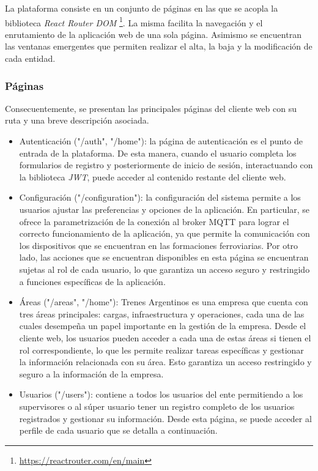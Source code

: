 La plataforma consiste en un conjunto de páginas en las que se acopla la biblioteca \textit{React Router DOM} \footnote{\url{https://reactrouter.com/en/main}}. La misma facilita la navegación y el enrutamiento de la aplicación web de una sola página. Asimismo se encuentran las ventanas emergentes que permiten realizar el alta, la baja y la modificación de cada entidad.


\subsubsection{Páginas}

Consecuentemente, se presentan las principales páginas del cliente web con su ruta y una breve descripción asociada.


\begin{itemize}

  \item Autenticación ("/auth", "/home"):
      la página de autenticación es el punto de entrada de la plataforma. De esta manera, cuando el usuario completa los formularios de registro y posteriormente de inicio de sesión, interactuando con la biblioteca \textit{JWT}, puede acceder al contenido restante del cliente web.

  \item Configuración ("/configuration"):
    la configuración del sistema permite a los usuarios ajustar las preferencias y opciones de la aplicación. En particular, se ofrece la parametrización de la conexión al broker MQTT para lograr el correcto funcionamiento de la aplicación, ya que permite la comunicación con los dispositivos que se encuentran en las formaciones ferroviarias. Por otro lado, las acciones que se encuentran disponibles en esta página se encuentran sujetas al rol de cada usuario, lo que garantiza un acceso seguro y restringido a funciones específicas de la aplicación.

  \item Áreas ("/areas", "/home"):
    Trenes Argentinos es una empresa que cuenta con tres áreas principales: cargas, infraestructura y operaciones, cada una de las cuales desempeña un papel importante en la gestión de la empresa. Desde el cliente web, los usuarios pueden acceder a cada una de estas áreas si tienen el rol correspondiente, lo que les permite realizar tareas específicas y gestionar la información relacionada con su área. Esto garantiza un acceso restringido y seguro a la información de la empresa.

  \item Usuarios ("/users"):
    contiene a todos los usuarios del ente permitiendo a los supervisores o al súper usuario tener un registro completo de los usuarios registrados y gestionar su información. Desde esta página, se puede acceder al perfile de cada usuario que se detalla a continuación. 


\end{itemize}
